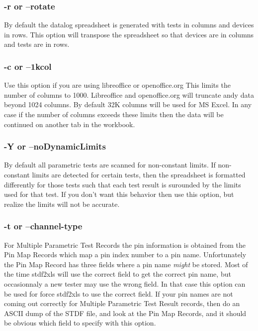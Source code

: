\documentclass[letterpaper]{article}
\begin{document}
\subsubsection{\bf -r or --rotate}
By default the datalog spreadsheet is generated with tests in columns and devices in rows.  This
option will transpose the spreadsheet so that devices are in columns and tests are in rows.

\subsubsection{\bf -c or --1kcol}
Use this option if you are using libreoffice or openoffice.org  This limits the number
of columns to 1000.  Libreoffice and openoffice.org will truncate andy data beyond 1024 columns.
By default 32K columns will be used for MS Excel.  In any case if the number of columns
exceeds these limits then the data will be continued on another tab in the workbook.

\subsubsection{\bf -Y or --noDynamicLimits}
By default all parametric tests are scanned for non-constant limits.  If non-constant
limits are detected for certain tests, then the spreadsheet is formatted differently
for those tests such that each test result is surounded by the limits used for that
test.  If you don't want this behavior then use this option, but realize the limits
will not be accurate.

\subsubsection{\bf -t or --channel-type}
For Multiple Parametric Test Records the pin information is obtained from
the Pin Map Records which map a pin index number to a pin name.  Unfortunately
the Pin Map Record has three fields where a pin name {\it might} be stored.
Most of the time stdf2xls will use the correct field to get the correct
pin name, but occasionnaly a new tester may use the wrong field.  In that
case this option can be used for force stdf2xls to use the correct field.
If your pin names are not coming out correctly for Multiple Parametric Test Result
records, then do an ASCII dump of the STDF file, and look at the Pin Map Records,
and it should be obvious which field to specify with this option.
\end{document}
